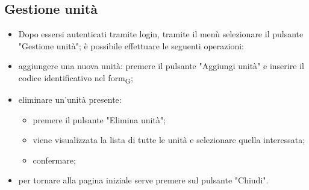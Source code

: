 \subsection{Gestione unità}
\begin{itemize}
\item Dopo essersi autenticati tramite login, tramite il menù selezionare il pulsante "Gestione unità"; è possibile effettuare le seguenti operazioni:
    \item aggiungere una nuova unità: premere il pulsante "Aggiungi unità" e inserire il codice identificativo nel form\textsubscript{G};
    \item eliminare un'unità presente: 
    \begin{itemize}
        \item premere il pulsante "Elimina unità";
        \item viene visualizzata la lista di tutte le unità e selezionare quella interessata;
        \item confermare;
    \end{itemize}
    \item per tornare alla pagina iniziale serve premere sul pulsante "Chiudi".
\end{itemize}